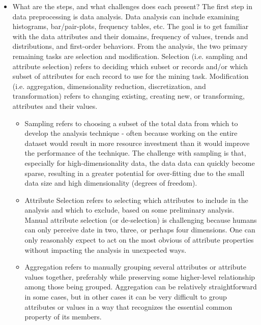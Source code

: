 \documentclass[fleqn,10pt]{SelfArx} %
\begin{document}
\begin{itemize}[noitemsep]

\item What are the steps, and what challenges does each present?  The first step in data preprocessing is data analysis.  Data analysis can include examining histograms, bar/pair-plots, frequency tables, etc.  The goal is to get familiar with the data attributes and their domains, frequency of values, trends and distributions, and first-order behaviors.  From the analysis, the two primary remaining tasks are selection and modification.  Selection (i.e. sampling and attribute selection) refers to deciding which subset or records and/or which subset of attributes for each record to use for the mining task.  Modification (i.e. aggregation, dimensionality reduction, discretization, and transformation) refers to changing existing, creating new, or transforming, attributes and their values.

\begin{itemize}
	
	\item Sampling refers to choosing a subset of the total data from which to develop the analysis technique - often because working on the entire dataset would result in more resource investment than it would improve the performance of the technique.  The challenge with sampling is that, especially for high-dimensionality data, the data data can quickly become sparse, resulting in a greater potential for over-fitting due to the small data size and high dimensionality (degrees of freedom).
	
	\item Attribute Selection refers to selecting which attributes to include in the analysis and which to exclude, based on some preliminary analysis.  Manual attribute selection (or de-selection) is challenging because humans can only perceive date in two, three, or perhaps four dimensions.  One can only reasonably expect to act on the most obvious of attribute properties without impacting the analysis in unexpected ways.
	
	\item Aggregation refers to manually grouping several attributes or attribute values together, preferably while preserving some higher-level relationship among those being grouped.  Aggregation can be relatively straightforward in some cases, but in other cases it can be very difficult to group attributes or values in a way that recognizes the essential common property of its members.
	

\end{itemize}
\end{itemize}
\end{document}
